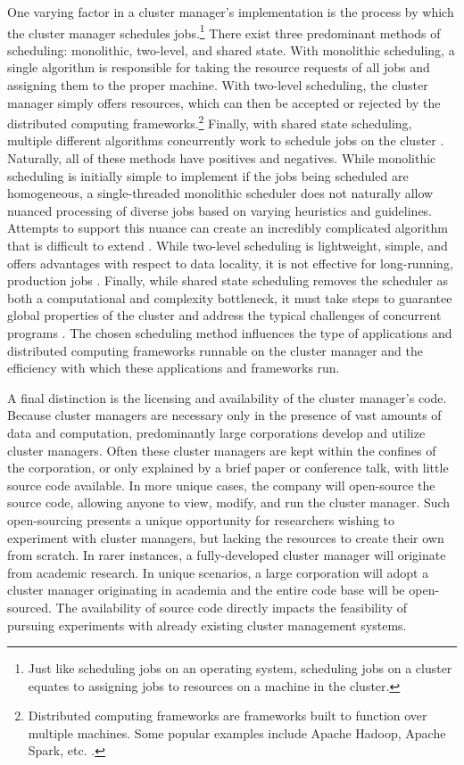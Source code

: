 One varying factor in a cluster manager's implementation is the process
by which the cluster manager schedules jobs.\footnote{Just like scheduling jobs
on an operating system, scheduling jobs on
a cluster equates to assigning jobs to resources on a machine in the cluster.}
There exist three predominant methods of scheduling: monolithic, two-level, and
shared state. With monolithic scheduling, a single algorithm
is responsible for taking the resource requests of all jobs and assigning them
to the proper machine. With two-level scheduling, the cluster manager simply
offers resources, which can then be accepted or rejected by the distributed
computing frameworks.\footnote{Distributed computing frameworks are frameworks
built to function over multiple machines. Some popular examples include
Apache Hadoop, Apache Spark, etc. \cite{mesos}.}
Finally, with shared state scheduling, multiple different algorithms concurrently work to
schedule jobs on the cluster \cite{omega}. Naturally, all
of these methods have positives and negatives. While monolithic scheduling is
initially simple to implement if the jobs being scheduled are homogeneous,
a single-threaded monolithic scheduler does not naturally allow
nuanced processing of diverse jobs based on varying heuristics and guidelines.
Attempts to support this nuance can create an incredibly
complicated algorithm that is difficult to extend \cite{omega}.
While two-level scheduling is lightweight, simple, and offers advantages with respect to
data locality, it is not effective for long-running,
production jobs \cite{omega}.
Finally, while shared state scheduling removes the scheduler as
both a computational and complexity bottleneck, it must take steps to guarantee
global properties of the cluster and address the typical challenges of
concurrent programs \cite{omega}.
The chosen scheduling method
influences the type of applications and distributed computing frameworks
runnable on the cluster manager and the efficiency with which these applications
and frameworks run.

A final distinction is the licensing and availability of the cluster manager's code.
Because cluster managers are necessary only in the presence of vast amounts of
data and computation, predominantly large
corporations develop and utilize cluster managers. Often these cluster
managers are kept within the confines of the corporation, or only explained by a
brief paper or conference talk, with little source code available. In more
unique cases, the company will open-source the source code, allowing anyone to
view, modify, and run the cluster manager. Such open-sourcing presents a unique opportunity
for researchers wishing to experiment with cluster managers, but lacking the
resources to create their own from scratch. In rarer instances, a
fully-developed cluster manager will originate from academic research. In unique
scenarios, a large corporation will adopt a cluster manager originating in
academia and the entire code base will
be open-sourced. The availability of source code directly impacts the
feasibility of pursuing experiments with already existing cluster management
systems.

